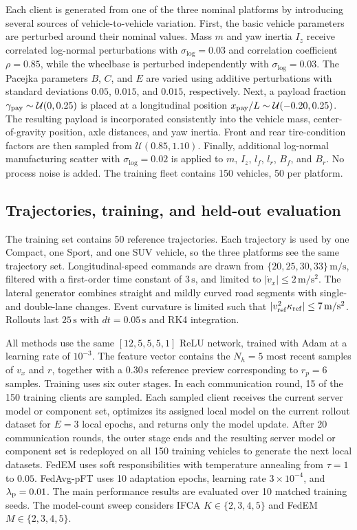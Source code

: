 Each client is generated from one of the three nominal platforms by introducing several sources of vehicle-to-vehicle variation.
First, the basic vehicle parameters are perturbed around their nominal values.
Mass $m$ and yaw inertia $I_z$ receive correlated log-normal perturbations with $\sigma_{\log}=0.03$ and correlation coefficient $\rho=0.85$, while the wheelbase is perturbed independently with $\sigma_{\log}=0.03$.
The Pacejka parameters $B$, $C$, and $E$ are varied using additive perturbations with standard deviations $0.05$, $0.015$, and $0.015$, respectively.
Next, a payload fraction $\gamma_{\rm pay}\sim\mathcal U(0,0.25)$ is placed at a longitudinal position $x_{\rm pay}/L\sim\mathcal U(-0.20,0.25)$.
The resulting payload is incorporated consistently into the vehicle mass, center-of-gravity position, axle distances, and yaw inertia.
Front and rear tire-condition factors are then sampled from $\mathcal U(0.85,1.10)$.
Finally, additional log-normal manufacturing scatter with $\sigma_{\log}=0.02$ is applied to $m$, $I_z$, $l_f$, $l_r$, $B_f$, and $B_r$.
No process noise is added.
The training fleet contains 150 vehicles, 50 per platform.

\subsection{Trajectories, training, and held-out evaluation}
%
The training set contains 50 reference trajectories.
Each trajectory is used by one Compact, one Sport, and one SUV vehicle, so the three platforms see the same trajectory set.
Longitudinal-speed commands are drawn from $\{20,25,30,33\}\,\mathrm{m/s}$, filtered with a first-order time constant of $3\,\mathrm{s}$, and limited to $|\dot v_x|\le2\,\mathrm{m/s^2}$.
The lateral generator combines straight and mildly curved road segments with single- and double-lane changes.
Event curvature is limited such that $|v_{\rm ref}^2\kappa_{\rm ref}|\le7\,\mathrm{m/s^2}$.
Rollouts last $25\,\mathrm{s}$ with $dt=0.05\,\mathrm{s}$ and RK4 integration.

All methods use the same $[12,5,5,5,1]$ ReLU network, trained with Adam at a learning rate of $10^{-3}$.
The feature vector contains the $N_h=5$ most recent samples of $v_x$ and $r$, together with a $0.30\,\mathrm{s}$ reference preview corresponding to $r_p=6$ samples.
Training uses six outer stages.
In each communication round, 15 of the 150 training clients are sampled.
Each sampled client receives the current server model or component set, optimizes its assigned local model on the current rollout dataset for $E=3$ local epochs, and returns only the model update.
After 20 communication rounds, the outer stage ends and the resulting server model or component set is redeployed on all 150 training vehicles to generate the next local datasets.
FedEM uses soft responsibilities with temperature annealing from $\tau=1$ to $0.05$.
FedAvg-pFT uses 10 adaptation epochs, learning rate $3\times10^{-4}$, and $\lambda_{\rm p}=0.01$.
The main performance results are evaluated over 10 matched training seeds.
The model-count sweep considers IFCA $K\in\{2,3,4,5\}$ and FedEM $M\in\{2,3,4,5\}$.

